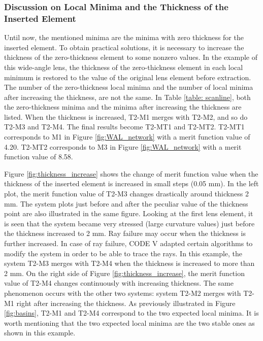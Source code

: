 \subsubsection{Discussion on Local Minima and the Thickness of the Inserted Element}
Until now, the mentioned minima are the minima with zero thickness for the inserted element. To obtain practical solutions, it is necessary to increase the thickness of the zero-thickness element to some nonzero values. In the example of this wide-angle lens, the thickness of the zero-thickness element in each local minimum is restored to the value of the original lens element before extraction. The number of the zero-thickness local minima and the number of local minima after increasing the thickness, are not the same. In Table \ref{table: scanline}, both the zero-thickness minima and the minima after increasing the thickness are listed. When the thickness is increased, T2-M1 merges with T2-M2, and so do T2-M3 and T2-M4. The final results become T2-MT1 and T2-MT2. T2-MT1 corresponds to M1 in Figure \ref{fig:WAL_network} with a merit function value of 4.20. T2-MT2 corresponds to M3 in Figure \ref{fig:WAL_network} with a merit function value of 8.58. 

Figure \ref{fig:thickness_increase} shows the change of merit function value when the thickness of the inserted element is increased in small steps (0.05 mm). In the left plot, the merit function value of T2-M3 changes drastically around thickness 2 mm. The system plots just before and after the peculiar value of  the thickness point are also illustrated in the same figure. Looking at the first lens element, it is seen that the system became very stressed (large curvature values) just before the thickness increased to 2 mm. Ray failure may occur when the thickness is further increased. In case of ray failure, CODE V adapted certain algorithms to modify the system in order to be able to trace the rays. In this example, the system T2-M3 merges with T2-M4 when the thickness is increased to more than 2 mm. On the right side of Figure \ref{fig:thickness_increase}, the merit function value of T2-M4 changes continuously with increasing thickness. The same phenomenon occurs with the other two systems: system T2-M2 merges with T2-M1 right after increasing the thickness. As previously illustrated in Figure \ref{fig:basins}, T2-M1 and T2-M4 correspond to the two expected local minima. It is worth mentioning that the two expected local minima are the two stable ones as shown in this example.

